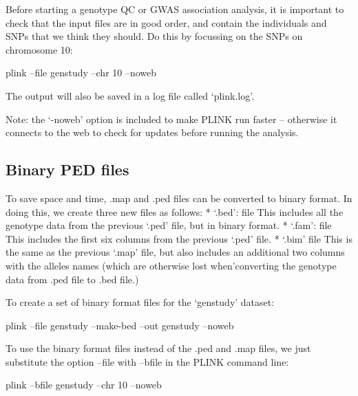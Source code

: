 \documentclass[]{book}
\newenvironment{Shaded}{\begin{snugshade}}{\end{snugshade}}
\newcommand{\ExtensionTok}[1]{#1}
\newcommand{\NormalTok}[1]{#1}
\begin{document}
Before starting a genotype QC or GWAS association analysis, it is
important to check that the input files are in good order, and contain
the individuals and SNPs that we think they should. Do this by focussing
on the SNPs on chromosome 10:

\begin{Shaded}
\begin{Highlighting}[]
\ExtensionTok{plink}\NormalTok{ --file genstudy --chr 10 --noweb}
\end{Highlighting}
\end{Shaded}

The output will also be saved in a log file called `plink.log'.

Note: the `-noweb' option is included to make PLINK run faster --
otherwise it connects to the web to check for updates before running the
analysis.

\subsection{Binary PED files}\label{binary-ped-files}

To save space and time, .map and .ped files can be converted to binary
format. In doing this, we create three new files as follows: * `.bed':
file This includes all the genotype data from the previous `.ped' file,
but in binary format. * `.fam': file This includes the first six columns
from the previous `.ped' file. * `.bim' file This is the same as the
previous `.map' file, but also includes an additional two columns with
the alleles names (which are otherwise lost when'converting the genotype
data from .ped file to .bed file.)

To create a set of binary format files for the `genstudy' dataset:

\begin{Shaded}
\begin{Highlighting}[]
\ExtensionTok{plink}\NormalTok{ --file genstudy --make-bed --out genstudy --noweb}
\end{Highlighting}
\end{Shaded}

To use the binary format files instead of the .ped and .map files, we
just substitute the option --file with --bfile in the PLINK command
line:

\begin{Shaded}
\begin{Highlighting}[]
\ExtensionTok{plink}\NormalTok{ --bfile genstudy --chr 10 --noweb}
\end{Highlighting}
\end{Shaded}
\end{document}
